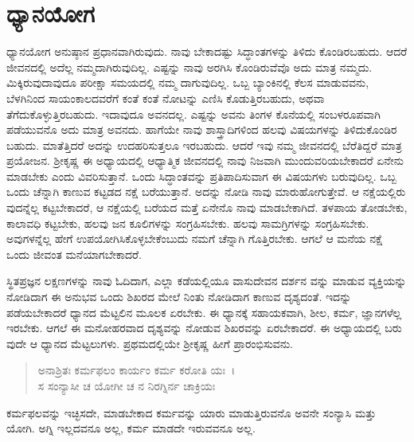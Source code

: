 
\chapter{ಧ್ಯಾನಯೋಗ}

ಧ್ಯಾನಯೋಗ ಅನುಷ್ಠಾನ ಪ್ರಧಾನವಾಗಿರುವುದು. ನಾವು ಬೇಕಾದಷ್ಟು ಸಿದ್ಧಾಂತಗಳನ್ನು ತಿಳಿದು ಕೊಂಡಿರಬಹುದು. ಆದರೆ ಜೀವನದಲ್ಲಿ ಅದೆಲ್ಲ ನಮ್ಮದಾಗಿರುವುದಿಲ್ಲ. ಎಷ್ಟನ್ನು ನಾವು ಅರಗಿಸಿ ಕೊಂಡಿರುವೆವೊ ಅದು ಮಾತ್ರ ನಮ್ಮದು. ಮಿಕ್ಕಿರುವುದಾವುದೂ ಪರೀಕ್ಷಾ ಸಮಯದಲ್ಲಿ ನಮ್ಮ ದಾಗುವುದಿಲ್ಲ. ಒಬ್ಬ ಬ್ಯಾಂಕಿನಲ್ಲಿ ಕೆಲಸ ಮಾಡುವವನು, ಬೆಳಗಿನಿಂದ ಸಾಯಂಕಾಲದವರೆಗೆ ಕಂತೆ ಕಂತೆ ನೋಟನ್ನು ಎಣಿಸಿ ಕೊಡುತ್ತಿರಬಹುದು, ಅಥವಾ ತೆಗೆದುಕೊಳ್ಳುತ್ತಿರಬಹುದು. ಇದಾವುದೂ ಅವನದಲ್ಲ. ಎಷ್ಟನ್ನು ಅವನು ತಿಂಗಳ ಕೊನೆಯಲ್ಲಿ ಸಂಬಳರೂಪವಾಗಿ ಪಡೆಯುವನೊ ಅದು ಮಾತ್ರ ಅವನದು. ಹಾಗೆಯೇ ನಾವು ಶಾಸ್ತ್ರಾದಿಗಳಿಂದ ಹಲವು ವಿಷಯಗಳನ್ನು ತಿಳಿದುಕೊಂಡಿರ ಬಹುದು. ಮಾತೆತ್ತಿದರೆ ಅದನ್ನು ಉದಹರಿಸುತ್ತಲೂ ಇರಬಹುದು. ಆದರೆ ಇವು ನಮ್ಮ ಜೀವನದಲ್ಲಿ ಬೆರೆತಿದ್ದರೆ ಮಾತ್ರ ಪ್ರಯೋಜನ. ಶ‍್ರೀಕೃಷ್ಣ ಈ ಅಧ್ಯಾಯದಲ್ಲಿ ಆಧ್ಯಾತ್ಮಿಕ ಜೀವನದಲ್ಲಿ ನಾವು ನಿಜವಾಗಿ ಮುಂದುವರಿಯಬೇಕಾದರೆ ಏನೇನು ಮಾಡಬೇಕು ಎಂದು ವಿವರಿಸುತ್ತಾನೆ. ಒಂದು ಸಿದ್ಧಾಂತವನ್ನು ಪ್ರತಿಪಾದಿಸುವಾಗ ಈ ವಿಷಯಗಳು ಬರುವುದಿಲ್ಲ. ಒಬ್ಬ ಒಂದು ಚೆನ್ನಾಗಿ ಕಾಣುವ ಕಟ್ಟಡದ ನಕ್ಷೆ ಬರೆಯುತ್ತಾನೆ. ಅದನ್ನು ನೋಡಿ ನಾವು ಮಾರುಹೋಗುತ್ತೇವೆ. ಆ ನಕ್ಷೆಯಲ್ಲಿರು ವುದನ್ನೆಲ್ಲ ಕಟ್ಟಬೇಕಾದರೆ, ಆ ನಕ್ಷೆಯಲ್ಲಿ ಬರೆಯದ ಮತ್ತೆ ಏನೇನೊ ನಾವು ಮಾಡಬೇಕಾಗಿದೆ. ತಳಪಾಯ ತೋಡಬೇಕು, ಕಾಲಾವಧಿ ಕಟ್ಟಬೇಕು, ಹಲವು ಜನ ಕೂಲಿಗಳನ್ನು ಸಂಗ್ರಹಿಸಬೇಕು. ಹಲವು ಸಾಮಗ್ರಿಗಳನ್ನು ಸಂಗ್ರಹಿಸಬೇಕು. ಅವುಗಳನ್ನೆಲ್ಲ ಹೇಗೆ ಉಪಯೋಗಿಸಿಕೊಳ್ಳಬೇಕೆಂಬುದು ನಮಗೆ ಚೆನ್ನಾಗಿ ಗೊತ್ತಿರಬೇಕು. ಆಗಲೆ ಆ ಮನೆಯ ನಕ್ಷೆ ಒಂದು ಜೀವಂತ ಮನೆಯಾಗಬೇಕಾದರೆ.

ಸ್ಥಿತಪ್ರಜ್ಞನ ಲಕ್ಷಣಗಳನ್ನು ನಾವು ಓದಿದಾಗ, ಎಲ್ಲಾ ಕಡೆಯಲ್ಲಿಯೂ ವಾಸುದೇವನ ದರ್ಶನ ವನ್ನು ಮಾಡುವ ವ್ಯಕ್ತಿಯನ್ನು ನೋಡಿದಾಗ ಈ ಅನುಭವ ಒಂದು ಶಿಖರದ ಮೇಲೆ ನಿಂತು ನೋಡಿದಾಗ ಕಾಣುವ ದೃಶ್ಯದಂತೆ. ಇದನ್ನು ಪಡೆಯಬೇಕಾದರೆ ಧ್ಯಾನದ ಮೆಟ್ಟಲಿನ ಮೂಲಕ ಏರಬೇಕು. ಈ ಧ್ಯಾನಕ್ಕೆ ಸಹಾಯಕವಾಗಿ, ಶೀಲ, ಕರ್ಮ, ಜ್ಞಾನಗಳೆಲ್ಲ ಇರಬೇಕು. ಆಗಲೆ ಈ ಮನೋಹರವಾದ ದೃಶ್ಯವನ್ನು ನೋಡುವ ಶಿಖರವನ್ನು ಏರಬೇಕಾದರೆ. ಈ ಅಧ್ಯಾಯದಲ್ಲಿ ಬರು ವುದೇ ಆ ಧ್ಯಾನದ ಮೆಟ್ಟಲುಗಳು. ಪ್ರಥಮದಲ್ಲಿಯೇ ಶ‍್ರೀಕೃಷ್ಣ ಹೀಗೆ ಪ್ರಾರಂಭಿಸುವನು.

\begin{verse}
ಅನಾಶ್ರಿತಃ ಕರ್ಮಫಲಂ ಕಾರ್ಯಂ ಕರ್ಮ ಕರೋತಿ ಯಃ~।\\ಸ ಸಂನ್ಯಾಸೀ ಚ ಯೋಗೀ ಚ ನ ನಿರಗ್ನಿರ್ನ ಚಾಕ್ರಿಯಃ 
\end{verse}

{\small ಕರ್ಮಫಲವನ್ನು ಇಚ್ಛಿಸದೇ, ಮಾಡಬೇಕಾದ ಕರ್ಮವನ್ನು ಯಾರು ಮಾಡುತ್ತಿರುವನೊ ಅವನೇ ಸಂನ್ಯಾಸಿ ಮತ್ತು ಯೋಗಿ. ಅಗ್ನಿ ಇಲ್ಲದವನೂ ಅಲ್ಲ, ಕರ್ಮ ಮಾಡದೇ ಇರುವವನೂ ಅಲ್ಲ.}

